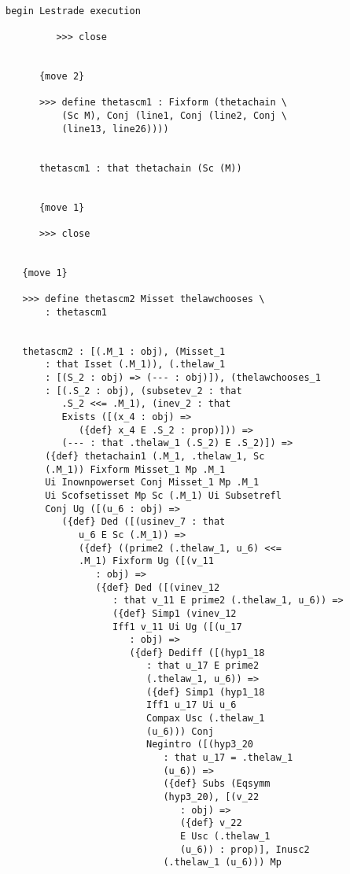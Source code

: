 \documentclass[12pt]{article}
\begin{document}
\begin{verbatim}

begin Lestrade execution

         >>> close


      {move 2}

      >>> define thetascm1 : Fixform (thetachain \
          (Sc M), Conj (line1, Conj (line2, Conj \
          (line13, line26))))


      thetascm1 : that thetachain (Sc (M))


      {move 1}

      >>> close


   {move 1}

   >>> define thetascm2 Misset thelawchooses \
       : thetascm1


   thetascm2 : [(.M_1 : obj), (Misset_1 
       : that Isset (.M_1)), (.thelaw_1 
       : [(S_2 : obj) => (--- : obj)]), (thelawchooses_1 
       : [(.S_2 : obj), (subsetev_2 : that 
          .S_2 <<= .M_1), (inev_2 : that 
          Exists ([(x_4 : obj) => 
             ({def} x_4 E .S_2 : prop)])) => 
          (--- : that .thelaw_1 (.S_2) E .S_2)]) => 
       ({def} thetachain1 (.M_1, .thelaw_1, Sc 
       (.M_1)) Fixform Misset_1 Mp .M_1 
       Ui Inownpowerset Conj Misset_1 Mp .M_1 
       Ui Scofsetisset Mp Sc (.M_1) Ui Subsetrefl 
       Conj Ug ([(u_6 : obj) => 
          ({def} Ded ([(usinev_7 : that 
             u_6 E Sc (.M_1)) => 
             ({def} ((prime2 (.thelaw_1, u_6) <<= 
             .M_1) Fixform Ug ([(v_11 
                : obj) => 
                ({def} Ded ([(vinev_12 
                   : that v_11 E prime2 (.thelaw_1, u_6)) => 
                   ({def} Simp1 (vinev_12 
                   Iff1 v_11 Ui Ug ([(u_17 
                      : obj) => 
                      ({def} Dediff ([(hyp1_18 
                         : that u_17 E prime2 
                         (.thelaw_1, u_6)) => 
                         ({def} Simp1 (hyp1_18 
                         Iff1 u_17 Ui u_6 
                         Compax Usc (.thelaw_1 
                         (u_6))) Conj 
                         Negintro ([(hyp3_20 
                            : that u_17 = .thelaw_1 
                            (u_6)) => 
                            ({def} Subs (Eqsymm 
                            (hyp3_20), [(v_22 
                               : obj) => 
                               ({def} v_22 
                               E Usc (.thelaw_1 
                               (u_6)) : prop)], Inusc2 
                            (.thelaw_1 (u_6))) Mp 

\end{verbatim}
\end{document}
